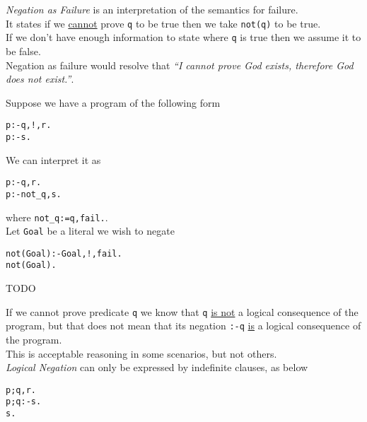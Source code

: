 \documentclass[11pt,a4paper]{article}
\begin{document}
\textit{Negation as Failure} is an interpretation of the semantics for failure.\\
It states if we \underline{cannot} prove \lstinline!q! to be true then we take \lstinline!not(q)! to be true.\\
\ie If we don't have enough information to state where \lstinline!q! is true then we assume it to be false.\\
\eg Negation as failure would resolve that \textit{``I cannot prove God exists, therefore God does not exist.''}.\\


Suppose we have a program of the following form
\begin{lstlisting}
p:-q,!,r.
p:-s.
\end{lstlisting}
We can interpret it as
\begin{lstlisting}
p:-q,r.
p:-not_q,s.
\end{lstlisting}
where \lstinline!not_q:=q,fail.!.\\

Let \lstinline!Goal! be a literal we wish to negate
\begin{lstlisting}
not(Goal):-Goal,!,fail.
not(Goal).
\end{lstlisting}

TODO\\


If we cannot prove predicate \lstinline!q! we know that \lstinline!q! \underline{is not} a logical consequence of the program, but that does not mean that its negation \lstinline!:-q! \underline{is} a logical consequence of the program.\\
This is acceptable reasoning in some scenarios, but not others.\\

\textit{Logical Negation} can only be expressed by indefinite clauses, as below
\begin{lstlisting}
p;q,r.
p;q:-s.
s.
\end{lstlisting}

\end{document}
